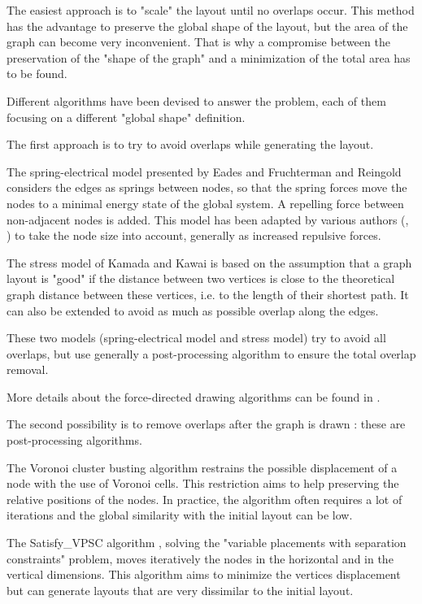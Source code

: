 \documentclass[12pt]{report}
\begin{document}
The easiest approach is to "scale" the layout until no overlaps occur. This method has the advantage to preserve the global shape of the layout, but the area of the graph can become very inconvenient. That is why a compromise between the preservation of the "shape of the graph" and a minimization of the total area has to be found.

Different algorithms have been devised to answer the problem, each of them focusing on a different "global shape" definition. 

\bigskip
The first approach is to try to avoid overlaps while generating the layout.

The spring-electrical model presented by Eades \cite{Eades84} and Fruchterman and Reingold \cite{FR91} considers the edges as springs between nodes, so that the spring forces move the nodes to a minimal energy state of the global system. A repelling force between non-adjacent nodes is added.
This model has been adapted by various authors (\cite{HK02}, \cite{Li05}) to take the node size into account, generally as increased repulsive forces.

The stress model of Kamada and Kawai \cite{Kamada89} is based on the assumption that a graph layout is "good" if the distance between two vertices is close to the theoretical graph distance between these vertices, i.e. to the length of their shortest path. It can also be extended to avoid as much as possible overlap along the edges.

These two models (spring-electrical model and stress model) try to avoid all overlaps, but use generally a post-processing algorithm to ensure the total overlap removal.

More details about the force-directed drawing algorithms can be found in \cite{Kob13}.

\bigskip
The second possibility is to remove overlaps after the graph is drawn : these are post-processing algorithms.

The Voronoi cluster busting algorithm \cite{Gansner98} restrains the possible displacement of a node with the use of Voronoi cells. This restriction aims to help preserving the relative positions of the nodes. In practice, the algorithm often requires a lot of iterations and the global similarity with the initial layout can be low. %

The Satisfy\_VPSC algorithm \cite{VPSC06}, solving the "variable placements with separation constraints" problem, moves iteratively the nodes in the horizontal and in the vertical dimensions. This algorithm aims to minimize the vertices displacement but can generate layouts that are very dissimilar to the initial layout. %
\end{document}

